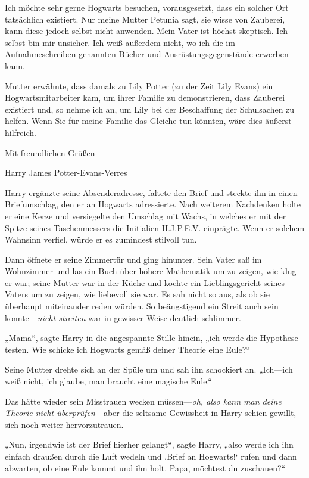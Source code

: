 {Ich möchte sehr gerne Hogwarts besuchen, vorausgesetzt, dass ein solcher Ort tatsächlich existiert. Nur meine Mutter Petunia sagt, sie wisse von Zauberei, kann diese jedoch selbst nicht anwenden. Mein Vater ist höchst skeptisch. Ich selbst bin mir unsicher. Ich weiß außerdem nicht, wo ich die im Aufnahmeschreiben genannten Bücher und Ausrüstungsgegenstände erwerben kann.

Mutter erwähnte, dass damals zu Lily Potter (zu der Zeit Lily Evans) ein Hogwartsmitarbeiter kam, um ihrer Familie zu demonstrieren, dass Zauberei existiert und, so nehme ich an, um Lily bei der Beschaffung der Schulsachen zu helfen. Wenn Sie für meine Familie das Gleiche tun könnten, wäre dies äußerst hilfreich.

Mit freundlichen Grüßen

Harry James Potter-Evans-Verres

Harry ergänzte seine Absenderadresse, faltete den Brief und steckte ihn in einen Briefumschlag, den er an Hogwarts adressierte. Nach weiterem Nachdenken holte er eine Kerze und versiegelte den Umschlag mit Wachs, in welches er mit der Spitze seines Taschenmessers die Initialien H.J.P.E.V. einprägte. Wenn er solchem Wahnsinn verfiel, würde er es zumindest stilvoll tun.

Dann öffnete er seine Zimmertür und ging hinunter. Sein Vater saß im Wohnzimmer und las ein Buch über höhere Mathematik um zu zeigen, wie klug er war; seine Mutter war in der Küche und kochte ein Lieblingsgericht seines Vaters um zu zeigen, wie liebevoll sie war. Es sah nicht so aus, als ob sie überhaupt miteinander reden würden. So beängstigend ein Streit auch sein konnte—\emph{nicht streiten} war in gewisser Weise deutlich schlimmer.

„Mama“, sagte Harry in die angespannte Stille hinein, „ich werde die Hypothese testen. Wie schicke ich Hogwarts gemäß deiner Theorie eine Eule?“

Seine Mutter drehte sich an der Spüle um und sah ihn schockiert an. „Ich—ich weiß nicht, ich glaube, man braucht eine magische Eule.“

Das hätte wieder sein Misstrauen wecken müssen—\emph{oh, also kann man deine Theorie nicht überprüfen}—aber die seltsame Gewissheit in Harry schien gewillt, sich noch weiter hervorzutrauen.

„Nun, irgendwie ist der Brief hierher gelangt“, sagte Harry, „also werde ich ihn einfach draußen durch die Luft wedeln und ‚Brief an Hogwarts!` rufen und dann abwarten, ob eine Eule kommt und ihn holt. Papa, möchtest du zuschauen?“

}
